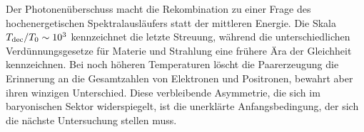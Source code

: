Der Photonenüberschuss macht die Rekombination zu einer Frage des hochenergetischen Spektralausläufers statt der mittleren Energie. Die Skala \(T_{\rm dec}/T_0\sim10^3\) kennzeichnet die letzte Streuung, während die unterschiedlichen Verdünnungsgesetze für Materie und Strahlung eine frühere Ära der Gleichheit kennzeichnen. Bei noch höheren Temperaturen löscht die Paarerzeugung die Erinnerung an die Gesamtzahlen von Elektronen und Positronen, bewahrt aber ihren winzigen Unterschied. Diese verbleibende Asymmetrie, die sich im baryonischen Sektor widerspiegelt, ist die unerklärte Anfangsbedingung, der sich die nächste Untersuchung stellen muss.
